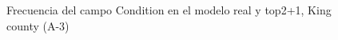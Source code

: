 \begin{figure}[H]
    \centering
    
    \caption{Frecuencia del campo Condition en el modelo real y top2+1, King county (A-3)}
    \label{frecuency-top2+1-condition}
\end{figure}